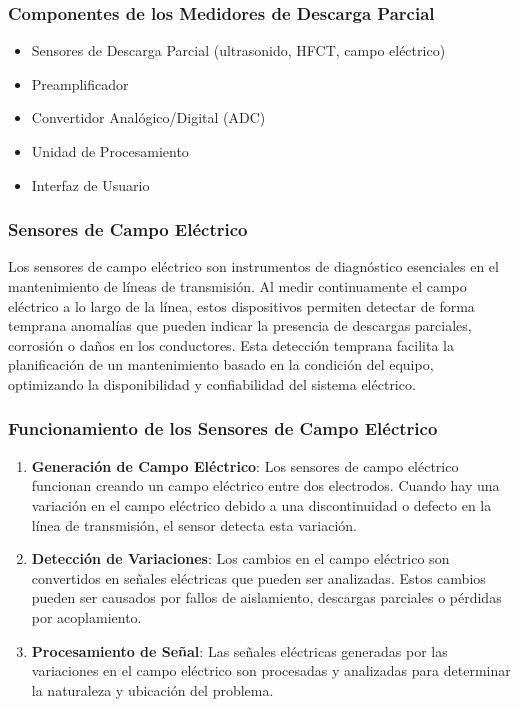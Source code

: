         \subsubsection*{Componentes de los Medidores de Descarga Parcial}

            \begin{itemize}
            \item Sensores de Descarga Parcial (ultrasonido, HFCT, campo eléctrico)
            \item Preamplificador
            \item Convertidor Analógico/Digital (ADC)
            \item Unidad de Procesamiento
            \item Interfaz de Usuario
            \end{itemize}

        \subsubsection{Sensores de Campo Eléctrico}

            Los sensores de campo eléctrico son instrumentos de diagnóstico esenciales en el mantenimiento de líneas de transmisión. Al medir continuamente el campo eléctrico a lo largo de la línea, estos dispositivos permiten detectar de forma temprana anomalías que pueden indicar la presencia de descargas parciales, corrosión o daños en los conductores. Esta detección temprana facilita la planificación de un mantenimiento basado en la condición del equipo, optimizando la disponibilidad y confiabilidad del sistema eléctrico.

        \subsubsection*{Funcionamiento de los Sensores de Campo Eléctrico}

            \begin{enumerate}
                \item \textbf{Generación de Campo Eléctrico}: Los sensores de campo eléctrico funcionan creando un campo eléctrico entre dos electrodos. Cuando hay una variación en el campo eléctrico debido a una discontinuidad o defecto en la línea de transmisión, el sensor detecta esta variación.
                \item \textbf{Detección de Variaciones}: Los cambios en el campo eléctrico son convertidos en señales eléctricas que pueden ser analizadas. Estos cambios pueden ser causados por fallos de aislamiento, descargas parciales o pérdidas por acoplamiento.
                \item \textbf{Procesamiento de Señal}: Las señales eléctricas generadas por las variaciones en el campo eléctrico son procesadas y analizadas para determinar la naturaleza y ubicación del problema.
            \end{enumerate}

